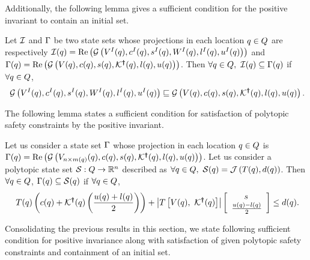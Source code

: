 Additionally, the following lemma gives a sufficient condition for the
positive invariant to contain an initial set.
\begin{lemma}
  Let $\mathcal{I}$ and $\Gamma$ be two state sets whose projections in
  each location $q\in Q$ are respectively
  $\mathcal{I}(q)=\operatorname{\operatorname{Re}}\left(\mathcal{G}\left(V^I(q),c^I(q),s^I(q),W^I(q),l^I(q),u^I(q)\right)\right)$
  and $\Gamma(q) =
  \operatorname{\operatorname{Re}}\left(\mathcal{G}\left(V(q),c(q),s(q),\mathcal{K}^{\bm{\dagger}}(q),l(q),u(q)\right)\right)$.
  Then $\forall q\in Q,~\mathcal{I}(q)\subseteq
  \Gamma(q)$ if $\forall q\in Q$,
\begin{align}~\label{eqn:initcont}
\mathcal{G}\left(V^I(q),c^I(q),s^I(q),W^I(q),l^I(q),u^I(q)\right)\sqsubseteq\mathcal{G}\left(V(q),c(q),s(q),\mathcal{K}^{\bm{\dagger}}(q),l(q),u(q)\right).
\end{align}
\end{lemma}

The following lemma states a sufficient condition for satisfaction of
polytopic safety constraints by the positive invariant.

\begin{lemma}
  Let us consider a state set $\Gamma$ whose projection in each
  location $q \in Q$ is $\Gamma(q) =
  \operatorname{\operatorname{Re}}\left(\mathcal{G}\left(V_{n\times
      m(q)}(q),c(q),s(q),\mathcal{K}^{\bm{\dagger}}(q),l(q),u(q)\right)\right)$.
  Let us consider a polytopic state set
  $\mathcal{S}:Q\rightarrow\mathbb{R}^n$ described as $\forall
  q\in Q,~\mathcal{S}(q)=\mathcal{J}\left(T(q),d(q)\right)$. Then
  $\forall q\in Q$, $\Gamma(q)\subseteq
  \mathcal{S}(q)$ if $\forall q\in Q$,
\begin{align}~\label{eqn:safecont}
T(q)\left(c(q)+\mathcal{K}^{\bm{\dagger}}(q)\left(\frac{u(q)+l(q)}{2}\right)\right)+\left|T\left[V(q),~\mathcal{K}^{\bm{\dagger}}(q)\right]\right|\left[\begin{array}{l}{\hspace{1.5em}s}\\{\frac{u(q)-l(q)}{2}} \end{array}\right]\leq d(q).
\end{align}
\end{lemma}

Consolidating the previous results in this section, we state following
sufficient condition for positive invariance along with satisfaction
of given polytopic safety constraints and containment of an initial set.

